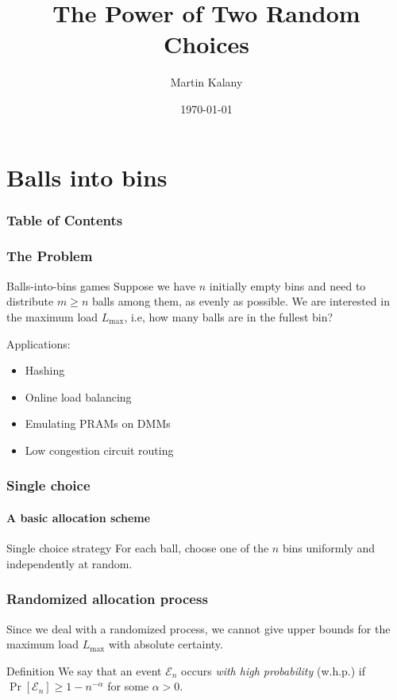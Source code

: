 \documentclass[serif,professionalfonts]{beamer}
\title{The Power of Two Random Choices}
\author[M. Kalany]{Martin Kalany}
\institute[TU Wien]
{
  Graduate student in Computer Science\\
  Vienna University of Technology\\
}
\date{\today}
\newcommand\load{L_{\mathrm{max}}}
\newcommand\scalefac{0.55}
\newcommand\ballsize{5mm}
\newcommand\nrbins{6}
\newcommand\padding{0.1*\ballsize}
\newcommand\bingap{1.6*\balldiameter}
\newcommand\balldiameter{2*\ballsize}
\newcommand\bin[1]{
	\path node[topflat, xshift=#1*\bingap*\scalefac, above, yshift=-\padding*\scalefac]  {};
}
\newcommand\bins{
	\foreach \ibin in {1,...,\nrbins}
		\bin{\ibin};
}
\newcommand\ball[2]{
	\shade[ballstyle] (#1*\bingap,#2*\balldiameter-\ballsize) circle (\ballsize)
}
\newcommand\putinbin[2]{
	\ifnum #2 > 0
		\foreach \nrballs in {1,...,#2}
 			\ball{#1}{\nrballs};
 	\fi
}
\newcounter{index}
\newcommand\balls[1]{%
	\getargsC{#1}%
  	\setcounter{index}{0}%
  	\whiledo{\theindex < \narg}{%
    		\stepcounter{index}%
    		\putinbin{\theindex}{\csname arg\romannumeral\theindex\endcsname}%
  	}%
}
\newcommand\bab[1]{%
	\bins
	\balls{#1}
}
\begin{document}
\begin{frame}
  \titlepage
\end{frame}
\note{}

\section{Balls into bins}
\begin{frame}
    \frametitle{Table of Contents}
    \tableofcontents
\end{frame}

\begin{frame}
\frametitle{The Problem}
\begin{block}{Balls-into-bins games}
Suppose we have $n$ initially empty bins and need to distribute $m \geq n$ balls among them, as evenly as possible. We are interested in the maximum load $\load$, i.e, how many balls are in the fullest bin?
\end{block}
\pause
\bigskip
Applications:
\begin{itemize}
	\item Hashing
	\item Online load balancing
	\item Emulating PRAMs on DMMs
	\item Low congestion circuit routing
\end{itemize}
\end{frame}

\begin{frame}
\frametitle{Single choice}
\framesubtitle{A basic allocation scheme}
\begin{block}{Single choice strategy}
For each ball, choose one of the $n$ bins uniformly and independently at random.
\end{block}
\bigskip
\begin{center}
\end{center}
\end{frame}

\begin{frame}
\frametitle{Randomized allocation process}

Since we deal with a randomized process, we cannot give upper bounds for the maximum load $\load$ with absolute certainty. 

\bigskip

\begin{block}{Definition}
We say that an event $\mathcal E_n$ occurs \emph{with high probability} (w.h.p.) if $\Pr\left[\mathcal E_n \right] \geq 1 - n^{-\alpha}$ for some $\alpha > 0$.
\end{block}
\end{frame}
\end{document}
